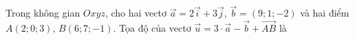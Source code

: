 \begin{ex}
Trong không gian $Oxyz$, cho hai vectơ $\vec a=2\vec i+3\vec j$, $\vec b=(9;1;-2)$ và hai điểm $A(2;0;3)$, $B(6;7;-1)$. Tọa độ của vectơ $\vec u=3\cdot\vec a-\vec b+\overrightarrow{AB}$ là
\end{ex}
